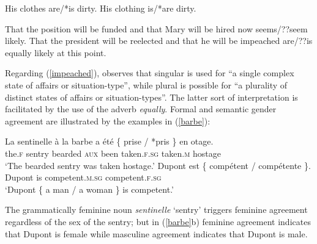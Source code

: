 \documentclass[output=paper
	        ,collection
	        ,collectionchapter
 	        ,biblatex
                ,babelshorthands
                ,newtxmath
                ,draftmode
                ,colorlinks, citecolor=brown
]{langscibook}
\begin{document}
\begin{exe} 
\ex \label{clothes}
 \begin{xlist}
\ex   His clothes are/*is dirty.
\ex   His clothing is/*are dirty.
\end{xlist}
\end{exe}

\begin{exe} 
\ex \label{impeached}
 \begin{xlist}
\ex   That the position will be funded and that Mary will be hired now seems/??seem likely.
\ex  	That the president will be reelected and that he will be impeached are/??is equally likely at this point.
\end{xlist}
\end{exe}

\noindent
Regarding (\ref{impeached}), \citet[564--565]{Mccloskey:1991} observes that singular is used for ``a single complex state of affairs or situation-type'', while plural is possible for ``a plurality of distinct states of affairs or situation-types''.  The latter sort of interpretation is facilitated by the use of the adverb \textit{equally}.   Formal and semantic gender agreement are illustrated by the  examples in (\ref{barbe}):

\begin{exe} 
\ex \label{barbe}
 \begin{xlist}
\ex   
\gll   La sentinelle	{\`{a} la barbe}	a \'{e}t\'{e}	\{ prise / *pris \} 	{en otage}.  \\
		the.\textsc{f} sentry	bearded	\textsc{aux} been	
		{} taken.\textsc{f.sg} {} taken.\textsc{m}	 {} hostage \\
\glt		`The bearded sentry was taken hostage.’
\ex   
\gll   Dupont	est	\{ comp\'{e}tent /		comp\'{e}tente \}. \\
		Dupont	is	{} competent.\textsc{m.sg} {}	competent.\textsc{f.sg} {} \\
\glt		`Dupont \{ a man / a woman \} is competent.’
 \end{xlist}
\end{exe} 

\noindent
The grammatically feminine noun \textit{sentinelle} `sentry'  triggers feminine agreement regardless of the sex of the sentry; but in (\ref{barbe}b) feminine agreement indicates that Dupont is female while masculine agreement indicates that Dupont is male.  
\end{document}
